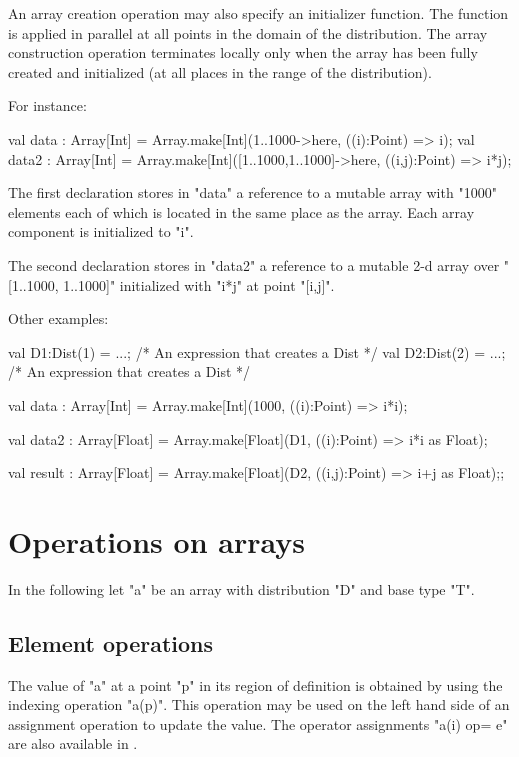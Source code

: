 An array creation operation may also specify an initializer
function.
The function is applied in parallel
at all points in the domain of the distribution. The array
construction operation terminates locally only when the array has been
fully created and initialized (at all places in the range of the
distribution).

For instance:
\begin{xten}
val data : Array[Int]
    = Array.make[Int](1..1000->here, ((i):Point) => i);
val data2 : Array[Int]
    = Array.make[Int]([1..1000,1..1000]->here, ((i,j):Point) => i*j);
\end{xten}

{}\noindent 
The first declaration stores in \xcd"data" a reference to a mutable
array with \xcd"1000" elements each of which is located in the
same place as the array. Each array component is initialized to \xcd"i".

The second declaration stores in \xcd"data2" a reference to a mutable
2-d array over \xcd"[1..1000, 1..1000]" initialized with \xcd"i*j"
at point \xcd"[i,j]".

Other examples:
\begin{xten}
val D1:Dist(1) = ...; /* An expression that creates a Dist */
val D2:Dist(2) = ...; /* An expression that creates a Dist */

val data : Array[Int]
    = Array.make[Int](1000, ((i):Point) => i*i);

val data2 : Array[Float]
    = Array.make[Float](D1, ((i):Point) => i*i as Float);

val result : Array[Float]
   = Array.make[Float](D2, ((i,j):Point) => i+j as Float);;
\end{xten}

\section{Operations on arrays}
In the following let \xcd"a" be an array with distribution \xcd"D" and
base type \xcd"T". 

\subsection{Element operations}
The value of \xcd"a" at a point \xcd"p" in its region of definition is
obtained by using the indexing operation \xcd"a(p)". This operation
may be used on the left hand side of an assignment operation to update
the value. The operator assignments \xcd"a(i) op= e" are also available
in \Xten{}.

